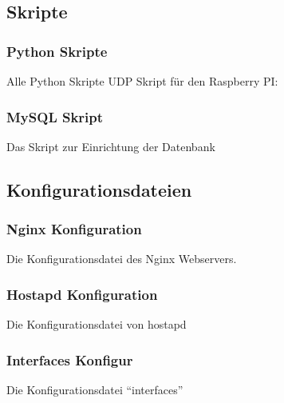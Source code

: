 
\subsection{Skripte}  
\label{sec:Skripte-1} 

\subsubsection{Python Skripte}
\label{sec:Pythonskripte}
Alle Python Skripte
\ac{UDP} Skript für den Raspberry PI:



\subsubsection{MySQL Skript}
\label{sec:MySQLSkript}
Das Skript zur Einrichtung der Datenbank


\subsection{Konfigurationsdateien}  
\label{sec:Konfigurationsdateien-1} 

\subsubsection{Nginx Konfiguration}
\label{sec:NginxKonfiguration}
Die Konfigurationsdatei des Nginx Webservers. 



\subsubsection{Hostapd Konfiguration}
\label{sec:HostapdSkript}
Die Konfigurationsdatei von hostapd


\subsubsection{Interfaces Konfigur}
\label{sec:NginxSkript}
Die Konfigurationsdatei ``interfaces''


